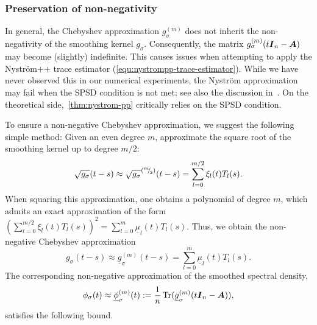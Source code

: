 \subsubsection{Preservation of non-negativity} \label{sec:preservnonneg}

In general, the Chebyshev approximation $g_{\sigma}^{(m)}$ does not inherit the  non-negativity of the smoothing kernel $g_{\sigma}$. Consequently, the matrix $g_{\sigma}^{(m)}(t \boldsymbol{I}_n - \boldsymbol{A})$ may become 
(slightly) indefinite. This causes issues when attempting to apply the Nyström++ trace estimator (\cref{equ:nystrompp-trace-estimator}). While we have never observed this in our numerical experiments, the Nyström approximation may fail when the SPSD condition is not met; see also the discussion in~\cite{nakatsukasa-2023-randomized-lowrank}. On the theoretical side,~\cref{thm:nystrom-pp}
critically relies on the SPSD condition.

To ensure a non-negative Chebyshev approximation, we suggest the following simple method: Given an even degree $m$, approximate the square root of the smoothing kernel up to degree $m/2$:
\begin{equation}
    \sqrt{g_{\sigma}}(t - s) \approx \sqrt{g_{\sigma}}^{({}^{m}{\mskip -5mu/\mskip -3mu}_{2})}(t - s) = \sum_{l=0}^{m/2} \xi_l(t) T_l(s).
    \label{equ:square-root-chebyshev-approximation}
\end{equation}
When squaring this approximation, one obtains a polynomial of degree $m$, which admits an exact approximation
of the form 
$(\sum_{l=0}^{m/2} \xi_l(t) T_l(s))^2 = \sum_{l=0}^{m} \underline{\mu}_l(t) T_l(s)$.
Thus, we obtain the non-negative Chebyshev approximation
\begin{equation}
g_{\sigma}(t - s) \approx    \underline{g}_{\sigma}^{(m)}(t - s) = \sum_{l=0}^{m} \underline{\mu}_l(t) T_l(s).
    \label{equ:non-negative-chebyshev-approximation}
\end{equation}
The corresponding non-negative approximation of the smoothed spectral density,
\begin{equation}
    \phi_{\sigma}(t) \approx \underline{\phi}_{\sigma}^{(m)}(t) := \frac{1}{n} \operatorname{Tr}(\underline{g}_{\sigma}^{(m)}(t\boldsymbol{I}_n - \boldsymbol{A})),
    \label{equ:non-negative-expanded-density}
\end{equation}
satisfies the following bound.

